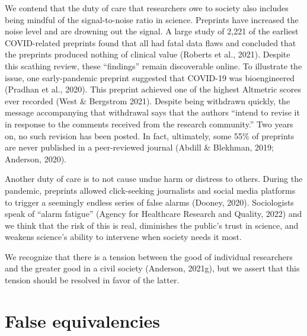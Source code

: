 \documentclass[authordate, perspective]{jote-new-article}
\begin{document}
	We contend that the duty of care that researchers owe to society also includes being mindful of the signal-to-noise ratio in science. Preprints have increased the noise level and are drowning out the signal. A large study of 2,221 of the earliest COVID-related preprints found that all had fatal data flaws and concluded that the preprints produced nothing of clinical value (Roberts et al., 2021). Despite this scathing review, these “findings” remain discoverable online. To illustrate the issue, one early-pandemic preprint suggested that COVID-19 was bioengineered (Pradhan et al., 2020). This preprint achieved one of the highest Altmetric scores ever recorded (West \& Bergstrom 2021). Despite being withdrawn quickly, the message accompanying that withdrawal says that the authors “intend to revise it in response to the comments received from the research community.” Two years on, no such revision has been posted. In fact, ultimately, some 55\% of preprints are never published in a peer-reviewed journal (Abdill \& Blekhman, 2019; Anderson, 2020).







	Another duty of care is to not cause undue harm or distress to others. During the pandemic, preprints allowed click-seeking journalists and social media platforms to trigger a seemingly endless series of false alarms (Dooney, 2020). Sociologists speak of “alarm fatigue” (Agency for Healthcare Research and Quality, 2022) and we think that the risk of this is real, diminishes the public's trust in science, and weakens science's ability to intervene when society needs it most.







	We recognize that there is a tension between the good of individual researchers and the greater good in a civil society (Anderson, 2021g), but we assert that this tension should be resolved in favor of the latter.







	\section{False equivalencies}
\end{document}
